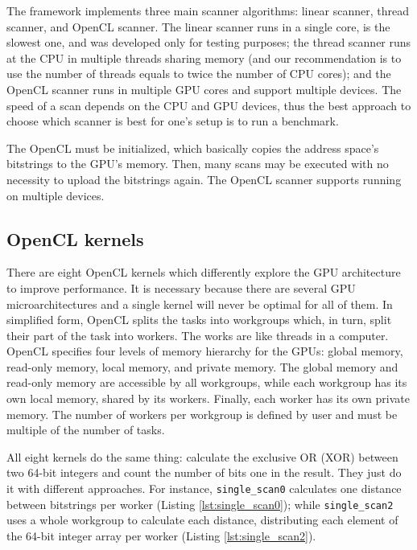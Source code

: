The framework implements three main scanner algorithms: linear scanner, thread scanner, and OpenCL scanner. The linear scanner runs in a single core, is the slowest one, and was developed only for testing purposes; the thread scanner runs at the CPU in multiple threads sharing memory (and our recommendation is to use the number of threads equals to twice the number of CPU cores); and the OpenCL scanner runs in multiple GPU cores and support multiple devices. The speed of a scan depends on the CPU and GPU devices, thus the best approach to choose which scanner is best for one's setup is to run a benchmark.

The OpenCL must be initialized, which basically copies the address space's bitstrings to the GPU's memory. Then, many scans may be executed with no necessity to upload the bitstrings again. The OpenCL scanner supports running on multiple devices.

\subsection{OpenCL kernels}

There are eight OpenCL kernels which differently explore the GPU architecture to improve performance. It is necessary because there are several GPU microarchitectures and a single kernel will never be optimal for all of them. In simplified form, OpenCL splits the tasks into workgroups which, in turn, split their part of the task into workers. The works are like threads in a computer. OpenCL specifies four levels of memory hierarchy for the GPUs: global memory, read-only memory, local memory, and private memory. The global memory and read-only memory are accessible by all workgroups, while each workgroup has its own local memory, shared by its workers. Finally, each worker has its own private memory. The number of workers per workgroup is defined by user and must be multiple of the number of tasks.

All eight kernels do the same thing: calculate the exclusive OR (XOR) between two 64-bit integers and count the number of bits one in the result. They just do it with different approaches. For instance, \lstinline{single_scan0} calculates one distance between bitstrings per worker (Listing \ref{lst:single_scan0}); while \lstinline{single_scan2} uses a whole workgroup to calculate each distance, distributing each element of the 64-bit integer array per worker (Listing \ref{lst:single_scan2}).

